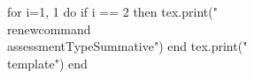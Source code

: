 \documentclass[twoside, 10pt]{article}
\title{}
\date{}
\newcommand{\assessmentType}{Formative}
\newcommand{\template}{
\directlua{tex.print(utils.genVersion())}
\noindent
{\large
First Name \rule{8em}{.4pt}\hspace{\stretch{1}} Last Name \rule{8em}{.4pt}\hspace{\stretch{1}} Date \rule{1.5em}{.4pt} -- \rule{1.5em}{.4pt} -- \rule{1.5em}{.4pt}\hspace{\stretch{1}} Period \rule{2em}{.4pt}\hspace{\stretch{1}}
}
\vspace{1em}

\noindent
\renewcommand{\arraystretch}{2}
\begin{tabular}{|l|l|l|}
\hline
\textbf{ARGUE}&\textbf{MODEL}&\textbf{BE PRECISE}\\
\hline
&&\\
\hline
\end{tabular}

\vspace{1em}
\noindent
\textbf{Tools:} calculator, ruler, protractor 
\vspace{1em}

\noindent
\begin{enumerate}
\item ({\textbf{Argue}}) Solve Problem 3 on the worksheet. Use the space below to show your calculation. Use the coordinate plane on the back to plot your angle then use the protractor to estimate the measure.
\vspace{\stretch{1}}
\clearpage

\begin{center}
\begin{tikzpicture}
\begin{axis}[
xlabel={$x$},
ylabel={$y$},
axis lines=middle,
ymin=-1.5, ymax=1.5,
xmin=-1.5, xmax=1.5,
width=7in,
height=7in,
grid = both,
xtick distance = 1,
ytick distance = 1,
minor y tick num = 9,
minor x tick num = 9,
grid style={draw=gray!80, dashed}
]
\end{axis}
\end{tikzpicture}
\end{center}
\item (\textbf{Be Precise}) Solve Problem 4 in the worksheet. Express your answer in the simplest radical form. \textbf{No decimal}.
\end{enumerate}
\clearpage
}
\begin{document}
\begin{luacode*}
for i=1, 1 do
	if i == 2 then
		tex.print("\\renewcommand{\\assessmentType}{Summative}")
	end
	tex.print("\\template")
end
\end{luacode*}
\end{document}
